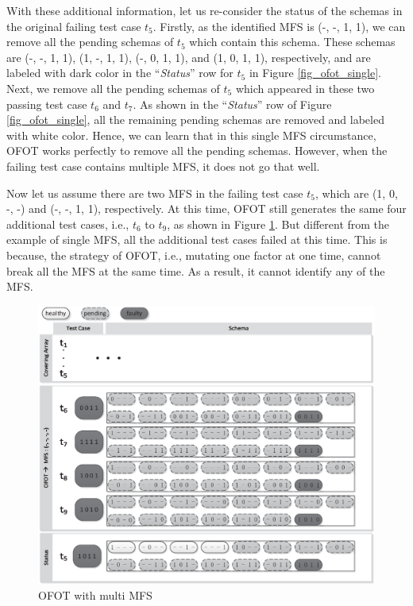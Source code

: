 With these additional information, let us re-consider the status of the schemas in the original failing test case $t_{5}$. Firstly, as the identified MFS is (-, -, 1, 1), we can remove all the pending schemas of $t_{5}$ which contain this schema. These schemas are (-, -, 1, 1), (1, -, 1, 1), (-, 0, 1, 1), and (1, 0, 1, 1), respectively, and are labeled with dark color in the  ``\emph{Status}'' row for $t_{5}$ in Figure \ref{fig_ofot_single}. Next, we remove all the pending schemas of $t_{5}$ which appeared in these two passing test case $t_{6}$ and $t_{7}$. As shown in the  ``\emph{Status}'' row of Figure \ref{fig_ofot_single}, all the remaining pending schemas are removed and labeled with white color. Hence, we can learn that in this single MFS circumstance, OFOT works perfectly to remove all the pending schemas. However, when the failing test case contains multiple MFS, it does not go that well.

Now let us assume there are two MFS in the failing test case $t_{5}$, which are (1, 0, -, -) and (-, -, 1, 1), respectively. At this time, OFOT still generates the same four additional test cases, i.e., $t_{6}$ to $t_{9}$,  as shown in Figure \ref{fig_ofot_multi}. But different from the example of single MFS,  all the additional test cases failed at this time. This is because, the strategy of OFOT, i.e., mutating one factor at one time, cannot break all the MFS at the same time. As a result, it cannot identify any of the MFS.
\begin{figure}[ht]
 \centering
 \includegraphics[width=5.6in]{ofot_multi.eps}
 \caption{OFOT with multi MFS}
 \label{fig_ofot_multi}
\end{figure}

